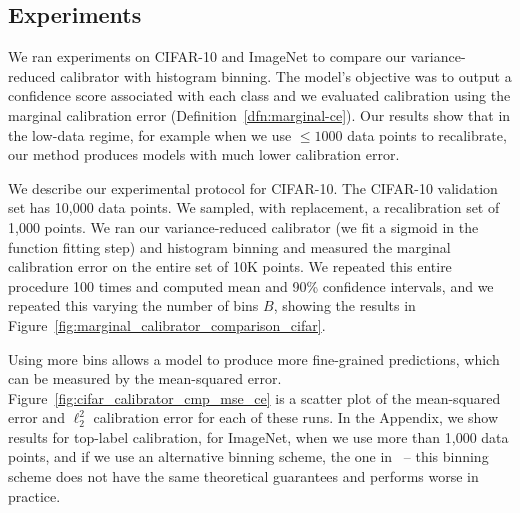 
\subsection{Experiments}

We ran experiments on CIFAR-10 and ImageNet to compare our variance-reduced calibrator with histogram binning. The model's objective was to output a confidence score associated with each class and we evaluated calibration using the marginal calibration error (Definition~\ref{dfn:marginal-ce}). Our results show that in the low-data regime, for example when we use $\leq 1000$ data points to recalibrate, our method produces models with much lower calibration error. 

We describe our experimental protocol for CIFAR-10.
The CIFAR-10 validation set has 10,000 data points. We sampled, with replacement, a recalibration set of 1,000 points. We ran our variance-reduced calibrator (we fit a sigmoid in the function fitting step) and histogram binning and measured the marginal calibration error on the entire set of 10K points.
We repeated this entire procedure 100 times and computed mean and 90\% confidence intervals, and we repeated this varying the number of bins $B$, showing the results in Figure~\ref{fig:marginal_calibrator_comparison_cifar}.

Using more bins allows a model to produce more fine-grained predictions, which can be measured by the mean-squared error. Figure~\ref{fig:cifar_calibrator_cmp_mse_ce} is a scatter plot of the mean-squared error and $\ell_2^2$ calibration error for each of these runs. In the Appendix, we show results for top-label calibration, for ImageNet, when we use more than 1,000 data points, and if we use an alternative binning scheme, the one in~\cite{guo2017calibration} -- this binning scheme does not have the same theoretical guarantees and performs worse in practice.

